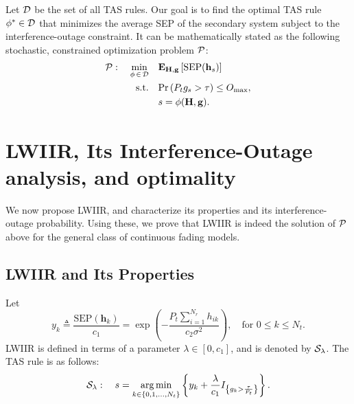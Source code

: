\documentclass[12pt,draftcls,peerreview,onecolumn]{IEEEtran}
\newcommand{\brac}[1]{\left({#1}\right)}
\newcommand{\cbrac}[1]{\left\{{#1}\right\}}
\newcommand{\indic}[1]{I_{\cbrac{#1}}}
\newcommand{\define}{\triangleq}
\newcommand{\tendsto}{\to}
\newcommand{\mtx}[1]{{\bf #1}} %
\newcommand{\explow}[2]{{\bf{E}}_{#1}\left[{#2}\right]}
\newcommand{\prob}[1]{\text{Pr}\brac{#1}}
\DeclareMathOperator*{\argmin}{arg\,min}
\newcommand{\SEP}{\text{SEP}}
\newcommand{\nx}{{0}}
\newcommand{\lam}{\lambda}
\newcommand{\Nt}{{N_t}}
\newcommand{\Nr}{{N_r}}
\newcommand{\Pt}{{P_t}}
\newcommand{\such}{h}
\newcommand{\puch}{g}
\newcommand{\hk}[1]{{\such_{#1}}}
\newcommand{\gk}[1]{{\puch_{#1}}}
\newcommand{\g}{\mathbf{\puch}}
\newcommand{\noisevar}{\sigma^2}
\newcommand{\outmax}{O_{\text{max}}}
\newcommand{\itau}{\tau}
\newcommand{\cone}{c_{1}}
\newcommand{\ctwo}{c_{2}}
\newcommand{\taubypt}{\frac{\itau}{\Pt}}
\newcommand{\gkgrtaubypt}[1]{{\gk{#1}}>\taubypt}
\newcommand{\gindic}[1]{\indic{\gkgrtaubypt{#1}}}
\newcommand{\lambym}{\frac{\lam}{\cone}}
\newcommand{\yk}[1]{y_{#1}}
\newcommand{\ykplusgk}[1]{ \yk{#1} + \lambym\gindic{#1}}
\newcommand{\allopts}{\left\{\nx,1,\ldots,\Nt\right\}}
\newcommand{\asrule}{\phi}
\newcommand{\asspan}{{\cal D}}
\newcommand{\Hmx}{\mtx{H}}
\newcommand{\optproblem}{{\cal P}}
\newcommand{\callamrule}{{\cal S_{{\lam}}}}
\newcommand{\hs}{\mathbf{\such}_{s}}
\newcommand{\bhk}[1]{\mathbf{\such}_{#1}}
\begin{document}
Let $\asspan$ be the set of all TAS rules. Our goal is to find the optimal TAS rule $\phi^{*}\in\asspan$ that minimizes the average SEP of the secondary system subject to the interference-outage constraint. It can be mathematically stated as the  following stochastic, constrained optimization problem $\optproblem$:
\begin{align}
\label{eq:objective}
\optproblem: \quad \min_{\asrule\,\in\,\asspan} \quad
&\explow{\Hmx,\g}{\SEP(\hs)} \\
\label{eq:cons}
\text{s.t.} \quad &\prob{\Pt\gk{s}>\itau} \leq \outmax, \\
 &s = \phi(\Hmx,\g). 
\end{align}



\section{LWIIR, Its Interference-Outage analysis, and optimality}
\label{sec:analysis}
%
We now propose LWIIR, and characterize its properties and its interference-outage probability. Using these, we prove that LWIIR is indeed the solution of  $\optproblem$ above for the general class of continuous fading models. %


\subsection{LWIIR and Its Properties}
\label{sec:lambda_rule}
Let 
\begin{equation}
\yk{k} \define \frac{\SEP(\bhk{k})}{\cone} = \exp\left({- \frac{\Pt\sum_{i=1}^{\Nr}\hk{ik}}{\ctwo\noisevar} }\right), \quad \text{for}\,\,  0\leq k \leq\Nt.
\label{eq:yi_def}
\end{equation}
LWIIR is defined in terms of a parameter $\lam \in \left[0, \cone\right]$, and is denoted by $\callamrule$. The TAS rule is as follows:
\begin{equation}
\callamrule: \quad s=\argmin\limits_{k\in\allopts} \left\{ \ykplusgk{k} \right\}.
\label{eq:lam_weight_rule}
\end{equation}
\end{document}
